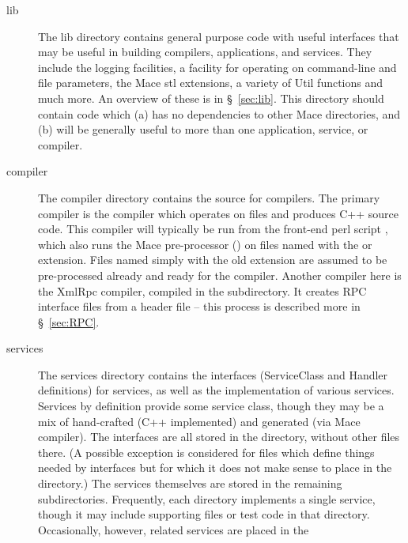 \begin{description}
\item[lib] The lib directory contains general purpose code with useful interfaces that may be 
            useful in building compilers, applications, and services.  They include the logging
            facilities, a facility for operating on command-line and file parameters, the Mace
            stl extensions, a variety of Util functions and much more.  An overview of these is
            in \S~\ref{sec:lib}.  This directory should contain code which (a) has no 
            dependencies to other Mace directories, and (b) will be generally useful to more than
            one application, service, or compiler.
\item[compiler] The compiler directory contains the source for compilers.  The primary compiler is the
             compiler which operates on \mac files and
            produces C++ source code.  This compiler will typically be run from
            the front-end perl script , which also runs the Mace
            pre-processor () on files named with the
             or  extension.  Files named simply
            with the old  extension are assumed to be
            pre-processed already and ready for the  compiler.
            Another compiler here is the XmlRpc compiler, compiled in the  
            subdirectory.  It creates RPC interface files from a header file -- this
            process is described more in \S~\ref{sec:RPC}.
\item[services] The services directory contains the interfaces (ServiceClass and Handler definitions) 
            for services, as well as the implementation of various services.  Services by definition
            provide some service class, though they may be a mix of hand-crafted (C++ implemented) and
            generated (via Mace compiler).  The interfaces are all stored in the 
            directory, without other files there.  (A possible exception is considered for files which
            define things needed by interfaces but for which it does not make sense to place in the 
             directory.)  The services themselves are stored in the remaining subdirectories.
            Frequently, each directory implements a single service, though it may include supporting files
            or test code in that directory.  Occasionally, however, related services are placed in the 

\end{description}
